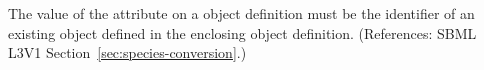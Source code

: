 The value of the  attribute on a \Species object
definition must be the identifier of an existing \Parameter object defined
in the enclosing \Model object definition.  (References: SBML L3V1
Section~\ref{sec:species-conversion}.)
